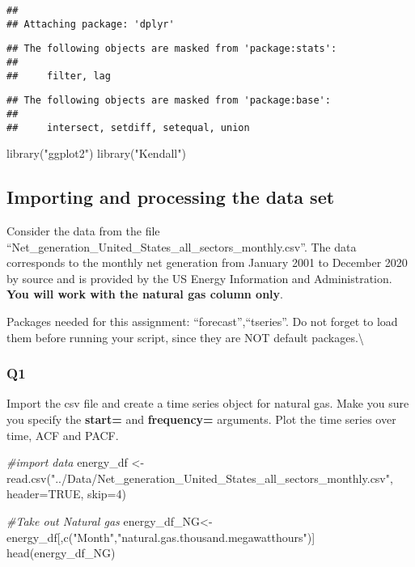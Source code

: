 \documentclass[
]{article}
\newenvironment{Shaded}{\begin{snugshade}}{\end{snugshade}}
\newcommand{\AttributeTok}[1]{\textcolor[rgb]{0.77,0.63,0.00}{#1}}
\newcommand{\CommentTok}[1]{\textcolor[rgb]{0.56,0.35,0.01}{\textit{#1}}}
\newcommand{\ConstantTok}[1]{\textcolor[rgb]{0.00,0.00,0.00}{#1}}
\newcommand{\DecValTok}[1]{\textcolor[rgb]{0.00,0.00,0.81}{#1}}
\newcommand{\FunctionTok}[1]{\textcolor[rgb]{0.00,0.00,0.00}{#1}}
\newcommand{\NormalTok}[1]{#1}
\newcommand{\OtherTok}[1]{\textcolor[rgb]{0.56,0.35,0.01}{#1}}
\newcommand{\StringTok}[1]{\textcolor[rgb]{0.31,0.60,0.02}{#1}}
\begin{document}
\begin{verbatim}
## 
## Attaching package: 'dplyr'
\end{verbatim}

\begin{verbatim}
## The following objects are masked from 'package:stats':
## 
##     filter, lag
\end{verbatim}

\begin{verbatim}
## The following objects are masked from 'package:base':
## 
##     intersect, setdiff, setequal, union
\end{verbatim}

\begin{Shaded}
\begin{Highlighting}[]
\FunctionTok{library}\NormalTok{(}\StringTok{"ggplot2"}\NormalTok{)}
\FunctionTok{library}\NormalTok{(}\StringTok{"Kendall"}\NormalTok{)}
\end{Highlighting}
\end{Shaded}

\hypertarget{importing-and-processing-the-data-set}{%
\subsection{Importing and processing the data
set}\label{importing-and-processing-the-data-set}}

Consider the data from the file
``Net\_generation\_United\_States\_all\_sectors\_monthly.csv''. The data
corresponds to the monthly net generation from January 2001 to December
2020 by source and is provided by the US Energy Information and
Administration. \textbf{You will work with the natural gas column only}.

Packages needed for this assignment: ``forecast'',``tseries''. Do not
forget to load them before running your script, since they are NOT
default packages.\textbackslash{}

\hypertarget{q1}{%
\subsubsection{Q1}\label{q1}}

Import the csv file and create a time series object for natural gas.
Make you sure you specify the \textbf{start=} and \textbf{frequency=}
arguments. Plot the time series over time, ACF and PACF.

\begin{Shaded}
\begin{Highlighting}[]
\CommentTok{\#import data}
\NormalTok{energy\_df }\OtherTok{\textless{}{-}} \FunctionTok{read.csv}\NormalTok{(}\StringTok{"../Data/Net\_generation\_United\_States\_all\_sectors\_monthly.csv"}\NormalTok{, }\AttributeTok{header=}\ConstantTok{TRUE}\NormalTok{, }\AttributeTok{skip=}\DecValTok{4}\NormalTok{)}

\CommentTok{\#Take out Natural gas}
\NormalTok{energy\_df\_NG}\OtherTok{\textless{}{-}}\NormalTok{energy\_df[,}\FunctionTok{c}\NormalTok{(}\StringTok{"Month"}\NormalTok{,}\StringTok{"natural.gas.thousand.megawatthours"}\NormalTok{)]}
\FunctionTok{head}\NormalTok{(energy\_df\_NG)}
\end{Highlighting}
\end{Shaded}
\end{document}
